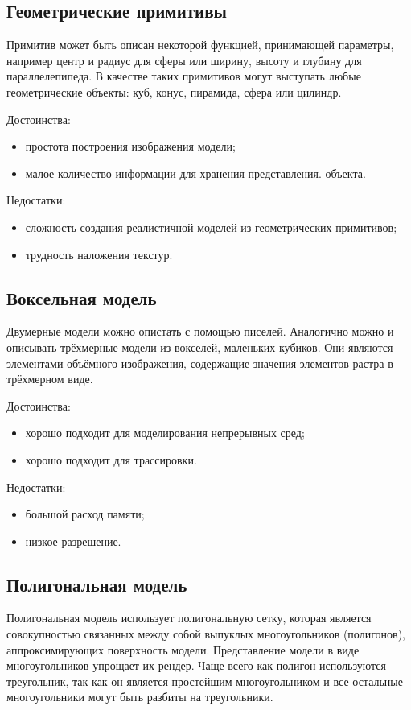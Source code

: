 \documentclass[12pt,a4paper,oneside]{report}
\begin{document}
    	\subsection{Геометрические примитивы}
    		\quad Примитив может быть описан некоторой функцией, принимающей параметры, например центр и радиус для сферы или ширину, высоту и глубину для параллелепипеда. В качестве таких примитивов могут выступать любые геометрические объекты: куб, конус, пирамида, сфера или цилиндр.
    		
    		\quad Достоинства:
    		\begin{itemize}
    			\item простота построения изображения модели;
    			\item малое количество информации для хранения представления. объекта.
    		\end{itemize}
    		\quad Недостатки:
    		\begin{itemize}
    			\item сложность создания реалистичной моделей из геометрических примитивов;
    			\item трудность наложения текстур.
    		\end{itemize}
    		\subsection{Воксельная модель}
    		\quad Двумерные модели можно опистать с помощью писелей. Аналогично можно и описывать трёхмерные модели из вокселей, маленьких кубиков. Они являются элементами объёмного изображения, содержащие значения элементов растра в трёхмерном виде.
    		
    		\quad Достоинства:
    		\begin{itemize}
    			\item хорошо подходит для моделирования непрерывных сред;
    			\item хорошо подходит для трассировки.
    		\end{itemize}
    		\quad Недостатки:
    		\begin{itemize}
    			\item большой расход памяти;
    			\item низкое разрешение.
    		\end{itemize}
    		\subsection{Полигональная модель}
    		\quad Полигональная модель использует полигональную сетку, которая является совокупностью связанных между собой выпуклых многоугольников (полигонов), аппроксимирующих поверхность модели. Представление модели в виде многоугольников упрощает их рендер. Чаще всего как полигон используются треугольник, так как он является простейшим многоугольником и все остальные многоугольники могут быть разбиты на треугольники.
    		
\end{document}
